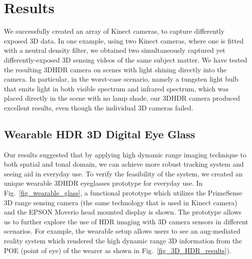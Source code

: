 

\section{Results}
We successfully created an array of Kinect cameras, to capture differently exposed 3D data. In one example, using two Kinect cameras, where one is fitted with a neutral density filter, we obtained two simultaneously captured yet differently-exposed 3D sensing videos of the same subject matter.  We have tested the resulting 3DHDR camera on scenes with light shining directly into the camera. In particular, in the worst-case scenario, namely a tungsten light bulb that emits light in both visible spectrum and infrared spectrum, which was placed directly in the scene with no lamp shade, our 3DHDR camera produced excellent results, even though the individual 3D cameras failed. 

\subsection{Wearable HDR 3D Digital Eye Glass}
Our results suggested that by applying high dynamic range imaging technique to both spatial and tonal domain, we can achieve more robust tracking system and seeing aid in everyday use. To verify the feasibility of the system, we created an unique wearable 3DHDR eyeglasses prototype for everyday use. In Fig.~\ref{fig_wearable_glass}, a functional prototype which utilizes the PrimeSense 3D range sensing camera (the same technology that is used in Kinect camera) and the EPSON Moverio head mounted display is shown. The prototype allows us to further explore the use of HDR imaging with 3D camera sensors in different scenarios. For example, the wearable setup allows users to see an aug-mediated reality system which rendered the high dynamic range 3D information from the POE (point of eye) of the wearer as shown in Fig.~\ref{fig_3D_HDR_results}).


%
%
%

